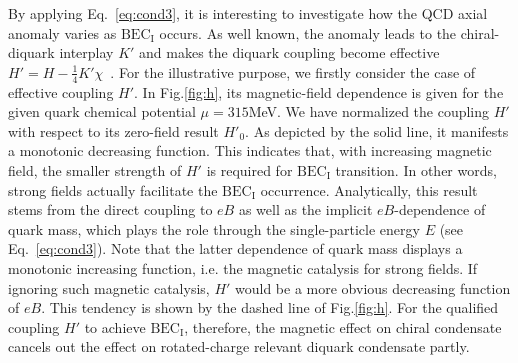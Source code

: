 \documentclass[prd, showpacs,nofootinbib,amsmath,amssymb,12pt]{revtex4}
\begin{document}
By applying Eq.~\eqref{eq:cond3}, it is interesting to investigate how
the QCD axial anomaly varies as $\text{BEC}_\text{I}$ occurs. As well known, the anomaly leads to the chiral-diquark interplay $K'$ and makes the diquark coupling become effective $H' = H -\frac{1}{4}K'\chi$~\cite{abuki2010nambu}. 
For the illustrative purpose, we firstly consider the case of effective coupling $H'$.
In Fig.\ref{fig:h}, its magnetic-field dependence is given for the given quark chemical potential $\mu=315$MeV.
We have normalized the coupling $H'$ with respect to its zero-field result $H'_0$.
As depicted by the solid line, it manifests a monotonic decreasing function.
This indicates that, with increasing magnetic field, the smaller strength of $H'$ is required for $\text{BEC}_\text{I}$ transition.
In other words, strong fields actually facilitate the $\text{BEC}_\text{I}$ occurrence.
Analytically, this result stems from the direct coupling to $eB$ as well as the implicit $eB$-dependence of quark mass, which plays the role through the single-particle energy $E$ (see Eq.~\eqref{eq:cond3}).
Note that the latter dependence of quark mass displays
a monotonic increasing function, i.e. the magnetic catalysis for strong fields.
If ignoring such magnetic catalysis, $H'$ would be a more obvious decreasing function of $eB$. This tendency is shown by the dashed line of Fig.\ref{fig:h}. 
For the qualified coupling $H'$ to achieve $\text{BEC}_\text{I}$, therefore, the magnetic effect on chiral condensate
cancels out the effect on rotated-charge relevant diquark condensate partly.
\end{document}
